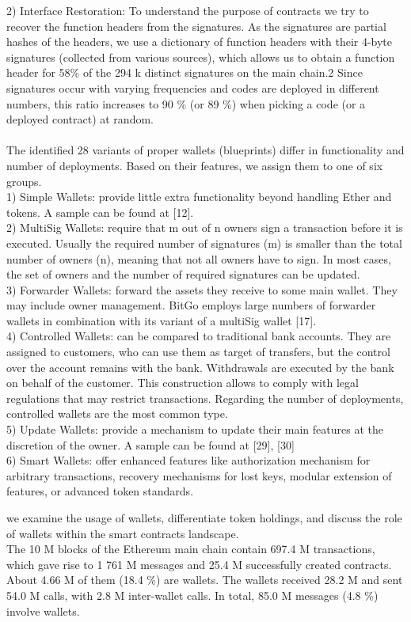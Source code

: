 \documentclass[12pt]{article}
\begin{document}
\par2) Interface Restoration: To understand the purpose of
contracts we try to recover the function headers from the
signatures. As the signatures are partial hashes of the headers,
we use a dictionary of function headers with their 4-byte
signatures (collected from various sources), which allows us to
obtain a function header for 58\% of the 294 k distinct signatures on the main chain.2 Since signatures occur with varying
frequencies and codes are deployed in different numbers, this
ratio increases to 90 \% (or 89 \%) when picking a code (or a
deployed contract) at random.
\\
\\
The identified 28 variants of proper wallets (blueprints)
differ in functionality and number of deployments. Based on
their features, we assign them to one of six groups.\\
1) Simple Wallets: provide little extra functionality beyond
handling Ether and tokens. A sample can be found at [12].\\
2) MultiSig Wallets: require that m out of n owners sign a
transaction before it is executed. Usually the required number
of signatures (m) is smaller than the total number of owners
(n), meaning that not all owners have to sign. In most cases,
the set of owners and the number of required signatures can
be updated.\\
3) Forwarder Wallets: forward the assets they receive to
some main wallet. They may include owner management.
BitGo employs large numbers of forwarder wallets in combination with its variant of a multiSig wallet [17].\\
4) Controlled Wallets: can be compared to traditional bank
accounts. They are assigned to customers, who can use them
as target of transfers, but the control over the account remains
with the bank. Withdrawals are executed by the bank on
behalf of the customer. This construction allows to comply
with legal regulations that may restrict transactions. Regarding
the number of deployments, controlled wallets are the most
common type.\\
5) Update Wallets: provide a mechanism to update their
main features at the discretion of the owner. A sample can be
found at [29], [30]\\
6) Smart Wallets: offer enhanced features like authorization
mechanism for arbitrary transactions, recovery mechanisms for
lost keys, modular extension of features, or advanced token
standards.
\par we examine the usage of wallets, differentiate token holdings, and discuss the role of wallets within the
smart contracts landscape.\\
The 10 M blocks of the Ethereum main chain contain
697.4 M transactions, which gave rise to 1 761 M messages
and 25.4 M successfully created contracts. About 4.66 M of
them (18.4 \%) are wallets. The wallets received 28.2 M and
sent 54.0 M calls, with 2.8 M inter-wallet calls. In total, 85.0 M
messages (4.8 \%) involve wallets.
\end{document}
